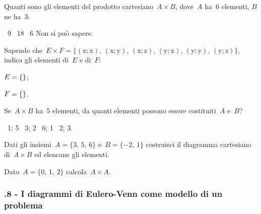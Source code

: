 \begin{esercizio}
 \label{ese:7.20}
Quanti sono gli elementi del prodotto cartesiano~$A\times B$, dove~$A$ ha~6 elementi, $B$ ne ha~3:
\begin{center}
 \boxA\quad~9 \quad\boxB\quad~18 \quad\boxC\quad~6 \quad\boxD\quad Non si può sapere.
\end{center}

\end{esercizio}


\begin{esercizio}
 \label{ese:7.21}
Sapendo che~$E\times F=\{(\text{x};\text{x})\text{, }(\text{x};\text{y})\text{, }(\text{x};\text{z})\text{, }(\text{y};\text{x})\text{, }(\text{y};\text{y})\text{, }(\text{y};\text{z})\}$, indica gli elementi di~$E$ e di~$F$:
\begin{multicols}{2}
\begin{enumeratea}
 \item $E=\{\dotfill\}$;
 \item $F=\{\dotfill\}$.
\end{enumeratea}
\end{multicols}
\end{esercizio}

\begin{esercizio}
 \label{ese:7.22}
Se~$A\times B$ ha~5 elementi, da quanti elementi possono essere costituiti~$A$ e~$B$?
\begin{center}
 \boxA\quad~1; 5 \quad\boxB\quad~3; 2 \quad\boxC\quad~6; 1 \quad\boxD\quad~2; 3.
\end{center}
\end{esercizio}

\begin{esercizio}
 \label{ese:7.23}
Dati gli insiemi~$A=\{\text{3, 5, 6}\}$ e~$B=\{-2\text{, }1\}$ costruisci il
diagramma cartesiano di~$A\times B$ ed elencane gli elementi.
\end{esercizio}

\begin{esercizio}
 \label{ese:7.24}
 Dato~$A=\{\text{0, 1, 2}\}$ calcola~$A\times A$.
\end{esercizio}

\subsubsection*{\thechapter.8 - I diagrammi di Eulero-Venn come modello di un problema}

